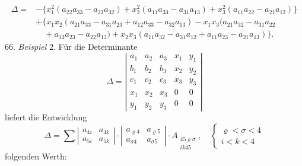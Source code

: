 \[
\begin{aligned}
\Delta ={}& -\{x_1^{2}(a_{22}a_{33}-a_{23}a_{32})+x_2^{2}(a_{11}a_{33}-a_{31}a_{13})+x_3^{2}(a_{11}a_{22}-a_{21}a_{12})\}\\
&+\{x_1x_2(a_{21}a_{33}-a_{31}a_{23}+a_{12}a_{33}-a_{32}a_{13})-x_1x_3(a_{21}a_{32}-a_{31}a_{22}\\
&\quad +a_{12}a_{23}-a_{22}a_{13})+x_2x_3(a_{11}a_{32}-a_{31}a_{12}+a_{11}a_{23}-a_{21}a_{13})\}.
\end{aligned}
\]
66. \textit{Beispiel} 2. Für die Determinante
\[
\Delta = \left|\begin{array}{ccccc}
a_1 & a_2 & a_3 & x_1 & y_1\\
b_1 & b_2 & b_3 & x_2 & y_2\\
c_1 & c_2 & c_3 & x_3 & y_3\\
x_1 & x_2 & x_3 & 0 & 0\\
y_1 & y_2 & y_3 & 0 & 0
\end{array}\right|
\]
liefert die Entwicklung
\[
\Delta = \sum \left|\begin{array}{cc} a_{4i} & a_{4k}\\ a_{5i} & a_{5k}\end{array}\right|\cdot \left|\begin{array}{cc} a_{\varrho4} & a_{\varrho5}\\ a_{\sigma4} & a_{\sigma5}\end{array}\right|\cdot A_{\substack{45\varrho\sigma\\ik45}},\quad \left\{\begin{array}{l}\varrho<\sigma<4\\ i<k<4\end{array}\right.
\]
folgenden Werth:
